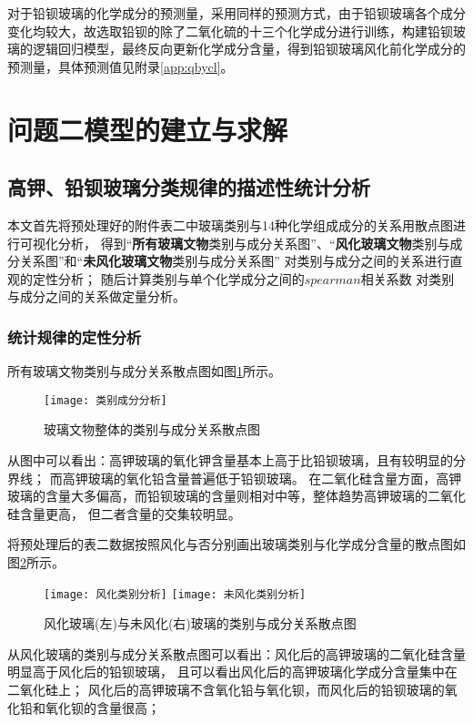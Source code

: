 \documentclass[withoutpreface,bwprint]{cumcmthesis} %
\begin{document}
对于铅钡玻璃的化学成分的预测量，采用同样的预测方式，由于铅钡玻璃各个成分变化均较大，故选取铅钡的除了二氧化硫的十三个化学成分进行训练，构建铅钡玻璃的逻辑回归模型，最终反向更新化学成分含量，得到铅钡玻璃风化前化学成分的预测量，具体预测值见附录\ref{app:qbycl}。


\section{问题二模型的建立与求解}
\subsection{高钾、铅钡玻璃分类规律的描述性统计分析}

本文首先将预处理好的附件表二中玻璃类别与14种化学组成成分的关系用散点图进行可视化分析， 得到“\textbf{所有玻璃文物}类别与成分关系图”、“\textbf{风化玻璃文物}类别与成分关系图”和“\textbf{未风化玻璃文物}类别与成分关系图” 对类别与成分之间的关系进行直观的定性分析； 随后计算类别与单个化学成分之间的$spearman$相关系数 对类别与成分之间的关系做定量分析。

\subsubsection{统计规律的定性分析}
所有玻璃文物类别与成分关系散点图如图\ref{ztgx}所示。

\begin{figure}[!h]
	\centering
	\texttt{[image: 类别成分分析]}
	\caption{玻璃文物整体的类别与成分关系散点图}
	\label{ztgx}
\end{figure}

从图中可以看出：高钾玻璃的氧化钾含量基本上高于比铅钡玻璃，且有较明显的分界线； 而高钾玻璃的氧化铅含量普遍低于铅钡玻璃。 在二氧化硅含量方面，高钾玻璃的含量大多偏高，而铅钡玻璃的含量则相对中等，整体趋势高钾玻璃的二氧化硅含量更高， 但二者含量的交集较明显。


将预处理后的表二数据按照风化与否分别画出玻璃类别与化学成分含量的散点图如图\ref{fhgx}所示。

\begin{figure}[!h]
	\centering
	\texttt{[image: 风化类别分析]}
	\texttt{[image: 未风化类别分析]}
	\caption{风化玻璃(左)与未风化(右)玻璃的类别与成分关系散点图}
	\label{fhgx}
\end{figure}


从风化玻璃的类别与成分关系散点图可以看出：风化后的高钾玻璃的二氧化硅含量明显高于风化后的铅钡玻璃， 且可以看出风化后的高钾玻璃化学成分含量集中在二氧化硅上； 风化后的高钾玻璃不含氧化铅与氧化钡，而风化后的铅钡玻璃的氧化铅和氧化钡的含量很高；
\end{document}
